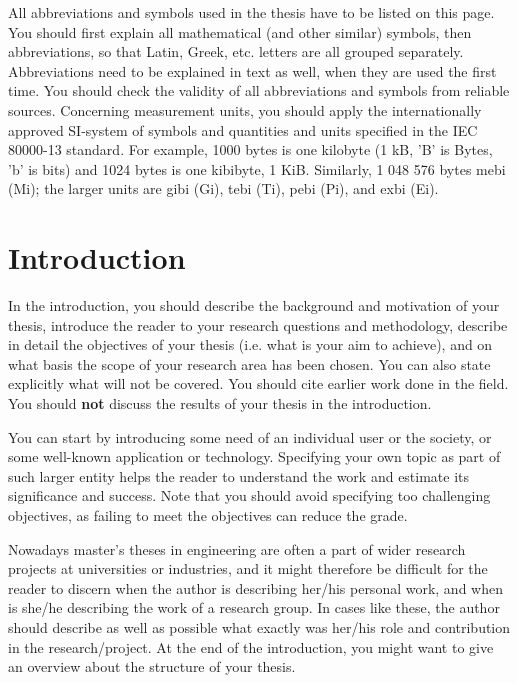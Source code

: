 All abbreviations and symbols used in the thesis have to be listed on this page. You should first explain all mathematical (and other similar) symbols, then abbreviations, so that Latin, Greek, etc. letters are all grouped separately. Abbreviations need to be explained in text as well, when they are used the first time. You should check the validity of all abbreviations and symbols from reliable sources. Concerning measurement units, you should apply the internationally approved SI-system of symbols \cite{siopas, systemofunits} and quantities and units specified in the IEC 80000-13 standard. For example, 1000 bytes is one kilobyte (1 kB, 'B' is Bytes, 'b' is bits) and 1024 bytes is one kibibyte, 1 KiB. Similarly, 1 048 576 bytes mebi (Mi); the larger units are gibi (Gi), tebi (Ti), pebi (Pi), and exbi (Ei).


\section{Introduction}

In the introduction, you should describe the background and motivation of your thesis, introduce the reader to your research questions and methodology, describe in detail the objectives of your thesis (i.e. what is your aim to achieve), and on what basis the scope of your research area has been chosen. You can also state explicitly what will not be covered. You should cite earlier work done in the field. You should \textbf{not} discuss the results of your thesis in the introduction.

You can start by introducing some need of an individual user or the society, or some well-known application or technology. Specifying your own topic as part of such larger entity helps the reader to understand the work and estimate its significance and success. Note that you should avoid specifying too challenging objectives, as failing to meet the objectives can reduce the grade.

Nowadays master’s theses in engineering are often a part of wider research projects at universities or industries, and it might therefore be difficult for the reader to discern when the author is describing her/his personal work, and when is she/he describing the work of a research group. In cases like these, the author should describe as well as possible what exactly was her/his role and contribution in the research/project. At the end of the introduction, you might want to give an overview about the structure of your thesis.

